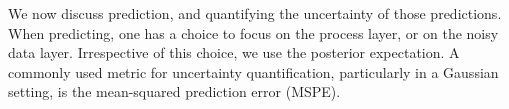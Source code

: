 \documentclass[12pt,a4paper]{article}
\begin{document}
We now discuss prediction, and quantifying the uncertainty of those predictions. 
When predicting, one has a choice to focus on the process layer, or on the noisy data layer. 
Irrespective of this choice, we use the posterior expectation. %
A commonly used metric for uncertainty quantification, particularly in a Gaussian setting, is the mean-squared prediction error (MSPE). 
\end{document}
